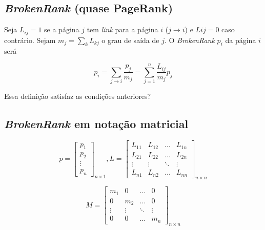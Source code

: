 \documentclass[
  letterpaper,
  DIV=11,
  numbers=noendperiod]{scrartcl}
\begin{document}
\hypertarget{brokenrank-quase-pagerank}{%
\subsection{\texorpdfstring{\emph{BrokenRank} (quase
PageRank)}{BrokenRank (quase PageRank)}}\label{brokenrank-quase-pagerank}}

Seja \(L_{ij} = 1\) se a página \(j\) tem \emph{link} para a página
\(i\) (\(j\rightarrow i\)) e \(L{ij} = 0\) caso contrário. Sejam
\(m_j=\sum_k L_{kj}\) o grau de saída de \(j\). O \emph{BrokenRank}
\(p_i\) da página \(i\) será

\[ p_i = \sum_{j\rightarrow i} \frac{p_j}{m_j} = \sum_{j=1}^n \frac{L_{ij}}{m_j}p_j \]

\begin{tcolorbox}[enhanced jigsaw, colbacktitle=quarto-callout-caution-color!10!white, colframe=quarto-callout-caution-color-frame, opacityback=0, breakable, toprule=.15mm, leftrule=.75mm, titlerule=0mm, coltitle=black, bottomtitle=1mm, colback=white, toptitle=1mm, title=\textcolor{quarto-callout-caution-color}{\faFire}\hspace{0.5em}{Danger}, arc=.35mm, rightrule=.15mm, bottomrule=.15mm, left=2mm, opacitybacktitle=0.6]
Essa definição satisfaz as condições anteriores?
\end{tcolorbox}

\hypertarget{brokenrank-em-notauxe7uxe3o-matricial}{%
\subsection{\texorpdfstring{\emph{BrokenRank} em notação
matricial}{BrokenRank em notação matricial}}\label{brokenrank-em-notauxe7uxe3o-matricial}}

\[p = \begin{bmatrix}p_1 \\ p_2\\ \vdots \\ p_n\end{bmatrix}_{n\times 1}, L = \begin{bmatrix}L_{11} & L_{12} & \ldots & L_{1n}\\ L_{21} & L_{22} & \ldots & L_{2n} \\ \vdots &\vdots&\ddots&\vdots\\ L_{n1} & L_{n2} & \ldots & L_{nn}\end{bmatrix}_{n\times n}\]

\[M = \begin{bmatrix}m_1 & 0 &\ldots & 0\\ 0 & m_2 & \ldots & 0\\\vdots &\vdots&\ddots&\vdots\\ 0 & 0 & \dots & m_n\end{bmatrix}_{n\times n}\]
\end{document}
